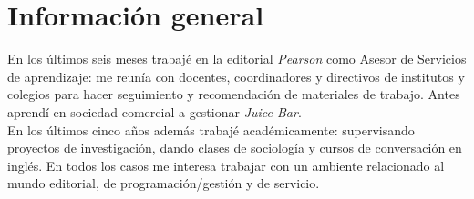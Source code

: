 \documentclass[a4paper,hidelinks]{twentysecondcv} %
\begin{document}
\begin{twenty} %
\end{twenty}


\section{Información general}


En los últimos seis meses trabajé en la editorial \textit{Pearson} como Asesor de Servicios de aprendizaje: me reunía con docentes, coordinadores y directivos de institutos y colegios para hacer seguimiento y recomendación de materiales de trabajo. 
Antes aprendí en sociedad comercial a gestionar \textit{Juice Bar}.
\\
En los últimos cinco años además trabajé académicamente: supervisando proyectos de investigación, dando clases de sociología y cursos de conversación en inglés. En todos los casos me interesa trabajar con un ambiente relacionado al mundo editorial, de programación/gestión y de servicio.

\end{document}
